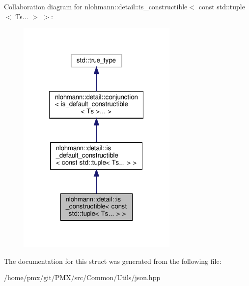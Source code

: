 Collaboration diagram for nlohmann\+:\+:detail\+:\+:is\+\_\+constructible$<$ const std\+:\+:tuple$<$ Ts... $>$ $>$\+:
\nopagebreak
\begin{figure}[H]
\begin{center}
\leavevmode
\includegraphics[width=223pt]{structnlohmann_1_1detail_1_1is__constructible_3_01const_01std_1_1tuple_3_01Ts_8_8_8_01_4_01_4__coll__graph}
\end{center}
\end{figure}


The documentation for this struct was generated from the following file\+:\begin{DoxyCompactItemize}
\item 
/home/pmx/git/\+P\+M\+X/src/\+Common/\+Utils/json.\+hpp\end{DoxyCompactItemize}

